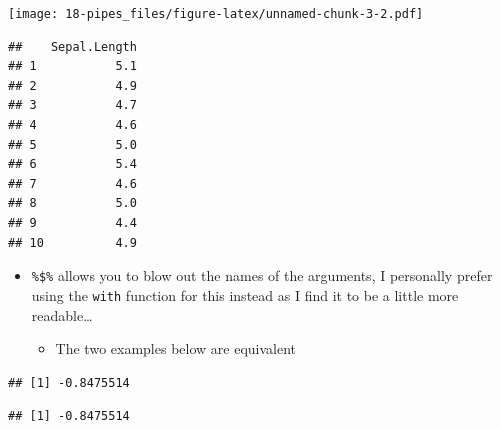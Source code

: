 \documentclass[]{book}
\newenvironment{Shaded}{\begin{snugshade}}{\end{snugshade}}
\newcommand{\DataTypeTok}[1]{\textcolor[rgb]{0.13,0.29,0.53}{#1}}
\newcommand{\KeywordTok}[1]{\textcolor[rgb]{0.13,0.29,0.53}{\textbf{#1}}}
\newcommand{\NormalTok}[1]{#1}
\newcommand{\OperatorTok}[1]{\textcolor[rgb]{0.81,0.36,0.00}{\textbf{#1}}}
\newcommand{\OtherTok}[1]{\textcolor[rgb]{0.56,0.35,0.01}{#1}}
\newcommand{\StringTok}[1]{\textcolor[rgb]{0.31,0.60,0.02}{#1}}
\providecommand{\tightlist}{%
  \setlength{\itemsep}{0pt}\setlength{\parskip}{0pt}}
\theoremstyle{definition}
\theoremstyle{definition}
\theoremstyle{definition}
\theoremstyle{remark}
\begin{document}
\texttt{[image: 18-pipes\_files/figure-latex/unnamed-chunk-3-2.pdf]}

\begin{verbatim}
##    Sepal.Length
## 1           5.1
## 2           4.9
## 3           4.7
## 4           4.6
## 5           5.0
## 6           5.4
## 7           4.6
## 8           5.0
## 9           4.4
## 10          4.9
\end{verbatim}

\begin{itemize}
\tightlist
\item
  \texttt{\%\$\%} allows you to blow out the names of the arguments, I
  personally prefer using the \texttt{with} function for this instead as
  I find it to be a little more readable\ldots{}

  \begin{itemize}
  \tightlist
  \item
    The two examples below are equivalent
  \end{itemize}
\end{itemize}

\begin{Shaded}
\end{Shaded}

\begin{verbatim}
## [1] -0.8475514
\end{verbatim}

\begin{Shaded}
\end{Shaded}

\begin{verbatim}
## [1] -0.8475514
\end{verbatim}

\begin{Shaded}
\end{Shaded}
\end{document}
